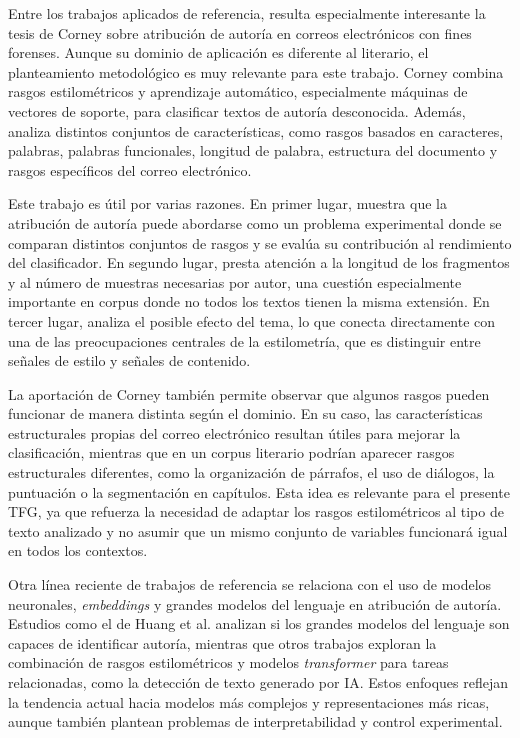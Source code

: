 \documentclass[IB]{TFUOC}%
\begin{document}
Entre los trabajos aplicados de referencia, resulta especialmente interesante la tesis de Corney sobre atribución de autoría en correos electrónicos con fines forenses\cite{corney2003analysing}. Aunque su dominio de aplicación es diferente al literario, el planteamiento metodológico es muy relevante para este trabajo. Corney combina rasgos estilométricos y aprendizaje automático, especialmente máquinas de vectores de soporte, para clasificar textos de autoría desconocida. Además, analiza distintos conjuntos de características, como rasgos basados en caracteres, palabras, palabras funcionales, longitud de palabra, estructura del documento y rasgos específicos del correo electrónico.

Este trabajo es útil por varias razones. En primer lugar, muestra que la atribución de autoría puede abordarse como un problema experimental donde se comparan distintos conjuntos de rasgos y se evalúa su contribución al rendimiento del clasificador. En segundo lugar, presta atención a la longitud de los fragmentos y al número de muestras necesarias por autor, una cuestión especialmente importante en corpus donde no todos los textos tienen la misma extensión. En tercer lugar, analiza el posible efecto del tema, lo que conecta directamente con una de las preocupaciones centrales de la estilometría, que es distinguir entre señales de estilo y señales de contenido.

La aportación de Corney también permite observar que algunos rasgos pueden funcionar de manera distinta según el dominio. En su caso, las características estructurales propias del correo electrónico resultan útiles para mejorar la clasificación, mientras que en un corpus literario podrían aparecer rasgos estructurales diferentes, como la organización de párrafos, el uso de diálogos, la puntuación o la segmentación en capítulos. Esta idea es relevante para el presente TFG, ya que refuerza la necesidad de adaptar los rasgos estilométricos al tipo de texto analizado y no asumir que un mismo conjunto de variables funcionará igual en todos los contextos.

Otra línea reciente de trabajos de referencia se relaciona con el uso de modelos neuronales, \textit{embeddings} y grandes modelos del lenguaje en atribución de autoría. Estudios como el de Huang et al.\cite{huang2024can} analizan si los grandes modelos del lenguaje son capaces de identificar autoría, mientras que otros trabajos exploran la combinación de rasgos estilométricos y modelos \textit{transformer} para tareas relacionadas, como la detección de texto generado por IA\cite{mikros2023ai}. Estos enfoques reflejan la tendencia actual hacia modelos más complejos y representaciones más ricas, aunque también plantean problemas de interpretabilidad y control experimental.
\end{document}

